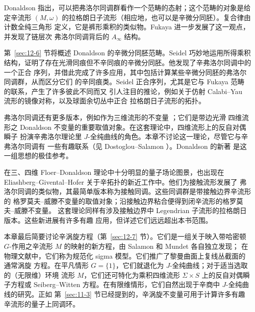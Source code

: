 Donaldson 指出，可以把弗洛尔同调群看作一个范畴的态射；这个范畴的对象是给定辛流形
$(M,\omega)$ 的拉格朗日子流形（相应地，也可以是辛微分同胚）。复合律由计数全纯三角形
定义，它是裤形乘积的类似物。Fukaya  进一步发展了这一观点，并发现了链层次
弗洛尔同调背后的 $A_\infty$ 结构。

第~\ref{sec:12-6} 节将概述 Donaldson 的辛微分同胚范畴。Seidel  巧妙地运用所得乘积
结构，证明了存在光滑同痕但不辛同痕的辛微分同胚。他发现了辛弗洛尔同调中的一个正合
序列，并借此完成了许多应用，其中包括计算某些辛微分同胚的弗洛尔同调群，从而区分它们
的辛同痕类。Seidel 正合序列，尤其是它与 Fukaya 范畴的联系，产生了许多彼此不同而又
引人注目的推论，例如关于仿射 Calabi--Yau 流形的镜像对称，以及球面余切丛中正合
拉格朗日子流形的拓扑。

弗洛尔同调还有更多版本，例如作为三维流形的不变量 ；它们是带边光滑
四维流形之 Donaldson 不变量的重要取值对象。在这套理论中，四维流形上的反自对偶瞬子
扮演辛弗洛尔理论里 $J$-全纯曲线的角色。本章不讨论这一理论，尽管它与辛弗洛尔同调有
一些有趣联系（见 Dostoglou--Salamon ）。Donaldson 的新著
 是这一组思想的极佳参考。

在三、四维 Floer--Donaldson 理论中十分明显的量子场论图景，也出现在
Eliashberg--Givental--Hofer  关于辛拓扑的新近工作中。他们为接触流形发展了
弗洛尔同调的类似物，其最简单版本称为接触同调。这些同调群是带接触边界辛流形的
格罗莫夫--威滕不变量的取值对象；沿接触边界粘合便得到闭辛流形的格罗莫夫--威滕不变量。
这套理论同样有涉及接触边界中 Legendrian 子流形的拉格朗日版本。这些新进展有许多有趣
应用，但详述它们远远超出本书范围。

本章最后简要讨论辛涡旋方程（第~\ref{sec:12-7} 节）。它们是一组关于映入带哈密顿 $G$-作用之辛流形
$M$ 的映射的新方程，由 Salamon  和 Mundet  各自独立发现；
在物理文献中，它们称为规范化 sigma 模型。它们推广了黎曼曲面上复线丛截面的通常涡旋
方程。在平凡情形 $G=\{1\}$，它们就退化为 $J$-全纯曲线；对于适当选取的（无限维）环境
流形 $M$，它们还可特化为乘积四维流形 $\Sigma\times S$ 上的反自对偶瞬子方程或
Seiberg--Witten 方程。在有限维情形，它们自然出现于辛商中 $J$-全纯曲线的研究。正如
第~\ref{sec:11-3} 节已经提到的，辛涡旋不变量可用于计算许多有趣辛流形的量子上同调环。

